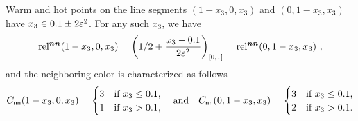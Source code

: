 \begin{lemma}
    \label{lem:symmetry-on-converted-coordinates}
    Warm and hot points on the line segments $(1-x_3, 0,x_3)$ and $(0, 1-x_3,x_3)$ have $x_3\in 0.1\pm 2\varepsilon^2$. For any such $x_3$, we have 
    \begin{align}
        \label{eqn:stronger-symmetry-on-converted-coordinates}
        \operatorname*{rel^{\boldsymbol{nn}}}(1-x_3, 0,x_3) = \left(1/2 + \frac{x_3-0.1}{2 \varepsilon^2}\right)_{[0,1]} =\operatorname*{rel^{\boldsymbol{nn}}}(0, 1-x_3, x_3)~,
    \end{align}
    and the neighboring color is characterized as follows
    \begin{align*}
        C_{\sf nn}(1-x_3,0,x_3) = \begin{cases}
            3 & \text{if $x_3\leq 0.1$,}\\
            1 & \text{if $x_3>0.1$,}
        \end{cases}
        \quad
        \text{and}
        \quad
        C_{\sf nn}(0,1-x_3,x_3) = \begin{cases}
            3 & \text{if $x_3\leq 0.1$,}\\
            2 & \text{if $x_3>0.1$.}
        \end{cases}
    \end{align*}
\end{lemma}

